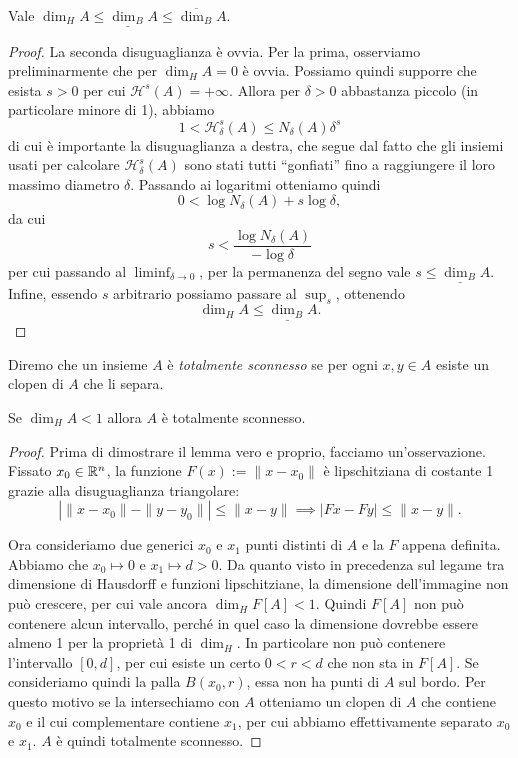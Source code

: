 \begin{lemma}
	Vale $\dim_{H}A \leq \underline{\dim_{B}}A \leq \overline{\dim_{B}}A$.
\end{lemma}
\begin{proof}
	La seconda disuguaglianza è ovvia. 
	Per la prima, osserviamo preliminarmente che per $\dim_{H}A = 0$ è ovvia. 
	Possiamo quindi supporre che esista $s>0$ per cui $\mathcal H^{s}(A) = +\infty$. 
	Allora per $\delta>0$ abbastanza piccolo (in particolare minore di 1), abbiamo 
	$$1<\mathcal H^{s}_{\delta}(A) \leq N_{\delta}(A) \delta^{s}$$
	di cui è importante la disuguaglianza a destra, che segue dal fatto che gli insiemi usati per calcolare $\mathcal H^{s}_{\delta}(A)$ sono stati tutti ``gonfiati'' fino a raggiungere il loro massimo diametro $\delta$.
	Passando ai logaritmi otteniamo quindi 
	$$0 < \log N_{\delta}(A) + s\log\delta,$$
	da cui 
	$$s < \frac{\log N_{\delta}(A)}{-\log\delta}$$
	per cui passando al $\liminf_{\delta\to0}$, per la permanenza del segno vale $s\leq \underline{\dim_{B}}A$.
	Infine, essendo $s$ arbitrario possiamo passare al $\sup_{s}$, ottenendo 
	$$\dim_{H}A \leq \underline{\dim_{B}}A.$$
\end{proof}

\begin{definizione}
	Diremo che un insieme $A$ è \emph{totalmente sconnesso} se per ogni $x,y\in A$ esiste un clopen di $A$ che li separa. 
\end{definizione}

\begin{lemma}
	Se $\dim_{H}A < 1$ allora $A$ è totalmente sconnesso. 
\end{lemma}
\begin{proof}
	Prima di dimostrare il lemma vero e proprio, facciamo un'osservazione. 
	Fissato $x_{0}\in\mathbb{R}^{n}$, la funzione $F(x) := \|x-x_{0}\|$ è lipschitziana di costante 1 grazie alla disuguaglianza triangolare: 
	$$|\|x-x_{0}\| - \|y-y_{0}\||\leq \|x-y\|\implies |Fx-Fy|\leq\|x-y\|.$$
	
	Ora consideriamo due generici $x_{0}$ e $x_{1}$ punti distinti di $A$ e la $F$ appena definita. Abbiamo che $x_{0}\mapsto 0$ e $x_{1}\mapsto d>0$. 
	Da quanto visto in precedenza sul legame tra dimensione di Hausdorff e funzioni lipschitziane, la dimensione dell'immagine non può crescere, per cui vale ancora $\dim_{H}F[A] < 1$. 
	Quindi $F[A]$ non può contenere alcun intervallo, perché in quel caso la dimensione dovrebbe essere almeno 1 per la proprietà 1 di $\dim_{H}$. 
	In particolare non può contenere l'intervallo $[0,d]$, per cui esiste un certo $0<r<d$ che non sta in $F[A]$. 
	Se consideriamo quindi la palla $B(x_{0},r)$, essa non ha punti di $A$ sul bordo. 
	Per questo motivo se la intersechiamo con $A$ otteniamo un clopen di $A$ che contiene $x_{0}$ e il cui complementare contiene $x_{1}$, per cui abbiamo effettivamente separato $x_{0}$ e $x_{1}$. $A$ è quindi totalmente sconnesso.
\end{proof}

